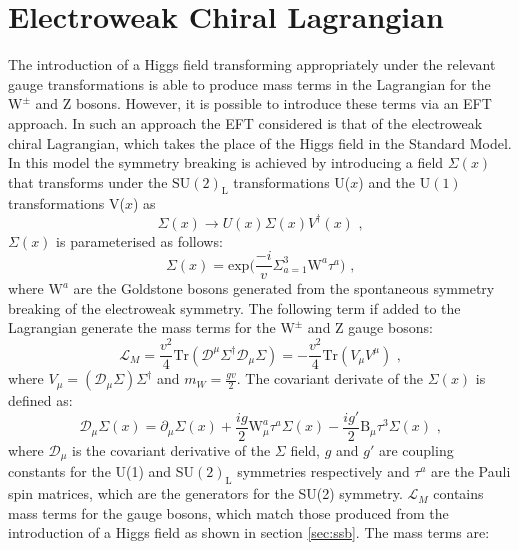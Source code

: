 \section{Electroweak Chiral Lagrangian}
The introduction of a Higgs field transforming appropriately under the relevant gauge transformations is able to produce mass terms in the Lagrangian for the $\text{W}^{\pm}$ and Z bosons.  However, it is possible to introduce these terms via an EFT approach.  In such an approach the EFT considered is that of the electroweak chiral Lagrangian, which takes the place of the Higgs field in the Standard Model.  In this model the symmetry breaking is achieved by introducing a field $\Sigma(x)$ that transforms under the $\text{SU}(2)_{\text{L}}$ transformations U($x$) and the $\text{U}(1)$ transformations V($x$) as
%
\begin{equation}
\Sigma(x) \rightarrow U(x) \Sigma(x) V^{\dagger}(x) \text{ ,}
\end{equation}
%
\noindent $\Sigma(x)$ is parameterised as follows:
%
\begin{equation}
\Sigma(x) = \text{exp} \bigg(\frac{-i}{v} \Sigma^{3}_{a=1} \text{W}^{a}\tau^{a}\bigg)\text{ ,}
\end{equation}
%
\noindent where $\text{W}^{a}$ are the Goldstone bosons generated from the spontaneous symmetry breaking of the electroweak symmetry.  The following term if added to the Lagrangian generate the mass terms for the $\text{W}^{\pm}$ and Z gauge bosons:
%
\begin{equation}
\mathcal{L}_{M} = \frac{v^{2}}{4} \text{Tr} (\mathcal{D}^{\mu} \Sigma^{\dagger} \mathcal{D}_{\mu} \Sigma) = -\frac{v^{2}}{4}\text{Tr}(V_{\mu} V^{\mu}) \text{ ,} 
\end{equation}
%
\noindent where $V_{\mu} = (\mathcal{D}_{\mu}\Sigma) \Sigma^{\dagger}$ and $m_{W} = \frac{gv}{2}$.  The covariant derivate of the $\Sigma(x)$ is defined as:
%
\begin{equation}
\mathcal{D}_{\mu} \Sigma(x) = \partial_{\mu} \Sigma(x) + \frac{ig}{2}\text{W}_{\mu}^{a}\tau^{a}\Sigma(x) - \frac{ig'}{2}\text{B}_{\mu}\tau^{3}\Sigma(x) \text{ ,}
\end{equation}
%
\noindent where $\mathcal{D}_{\mu}$ is the covariant derivative of the $\Sigma$ field, $g$ and $g'$ are coupling constants for the U(1) and SU$(2)_\text{L}$ symmetries respectively and $\tau^{a}$ are the Pauli spin matrices, which are the generators for the SU(2) symmetry.  $\mathcal{L}_{M}$ contains mass terms for the gauge bosons, which match those produced from the introduction of a Higgs field as shown in section \ref{sec:ssb}.  The mass terms are:
